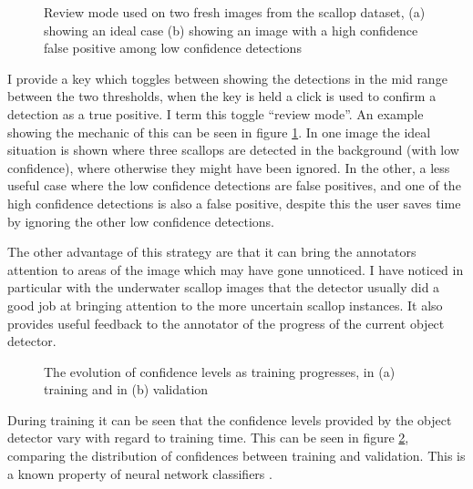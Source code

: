 \begin{figure}[h]
\begin{subfigure}[t]{0.5\linewidth}
  \caption{}
\end{subfigure}%
\caption{Review mode used on two fresh images from the scallop dataset, (a) showing an ideal case (b) showing an image with a high confidence false positive among low confidence detections}
\label {fig:scallop_review}
\end{figure}


I provide a key which toggles between showing the detections in the mid range between the two thresholds, when the key is held a click is used to confirm a detection as a true positive. I term this toggle ``review mode''.  An example showing the mechanic of this can be seen in figure \ref{fig:scallop_review}. In one image the ideal situation is shown where three scallops are detected in the background (with low confidence), where otherwise they might have been ignored. In the other, a less useful case where the low confidence detections are false positives, and one of the high confidence detections is also a false positive, despite this the user saves time by ignoring the other low confidence detections.

The other advantage of this strategy are that it can bring the annotators attention to areas of the image which may have gone unnoticed. I have noticed in particular with the underwater scallop images that the detector usually did a good job at bringing attention to the more uncertain scallop instances. It also provides useful feedback to the annotator of the progress of the current object detector. 




\begin{figure}[h]
\centering


\caption{ The evolution of confidence levels as training progresses, in (a) training and in (b) validation }
\label {fig:confidence}
\end{figure}

During training it can be seen that the confidence levels provided by the object detector vary with regard to training time. This can be seen in figure \ref{fig:confidence}, comparing the distribution of confidences between training and validation. This is a known property of neural network classifiers \cite{Guo2017}.

